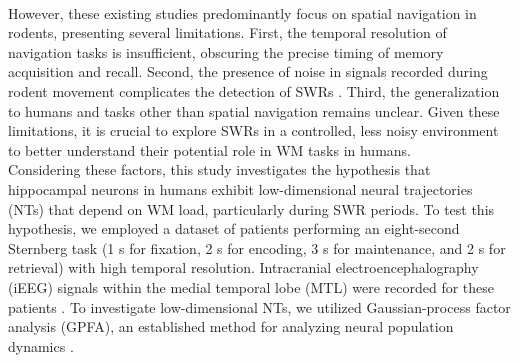 \\
\indent
However, these existing studies predominantly focus on spatial navigation in rodents, presenting several limitations. First, the temporal resolution of navigation tasks is insufficient, obscuring the precise timing of memory acquisition and recall. Second, the presence of noise in signals recorded during rodent movement complicates the detection of SWRs \cite{Watanabe_2021}. Third, the generalization to humans and tasks other than spatial navigation remains unclear. Given these limitations, it is crucial to explore SWRs in a controlled, less noisy environment to better understand their potential role in WM tasks in humans.
\\
\indent
Considering these factors, this study investigates the hypothesis that hippocampal neurons in humans exhibit low-dimensional neural trajectories (NTs) that depend on WM load, particularly during SWR periods. To test this hypothesis, we employed a dataset of patients performing an eight-second Sternberg task (1 s for fixation, 2 s for encoding, 3 s for maintenance, and 2 s for retrieval) with high temporal resolution. Intracranial electroencephalography (iEEG) signals within the medial temporal lobe (MTL) were recorded for these patients \cite{boran_dataset_2020}. To investigate low-dimensional NTs, we utilized Gaussian-process factor analysis (GPFA), an established method for analyzing neural population dynamics \cite{yu_gaussian-process_2009, churchland_stimulus_2010, lin_functional_2011, churchland_neural_2012, ecker_state_2014, kao_single-trial_2015, gallego_neural_2017, wei_orderly_2019, kim_corticalhippocampal_2023}.
\label{sec:introduction}